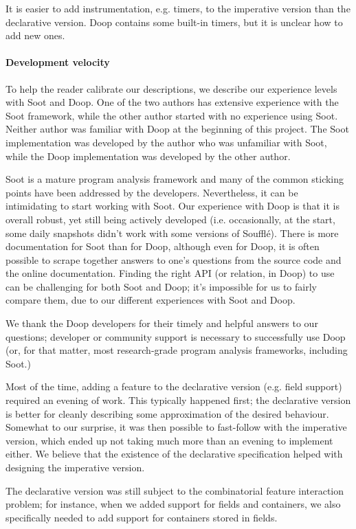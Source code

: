 It is easier to add instrumentation, e.g. timers, to the imperative version than the declarative version. Doop contains some built-in timers, but it is unclear how to add new ones.

\paragraph{Development velocity}
To help the reader calibrate our descriptions, we describe our experience levels with Soot and Doop. One of the two authors has extensive experience with the Soot framework, while the other author started with no experience using Soot. Neither author was familiar with Doop at the beginning of this project. The Soot implementation was developed by the author who was unfamiliar with Soot, while the Doop implementation was developed by the other author. 

Soot is a mature program analysis framework and many of the common sticking points have been addressed by the developers. Nevertheless, it can be intimidating to start working with Soot. Our experience with Doop is that it is overall robust, yet still being actively developed (i.e. occasionally, at the start, some daily snapshots didn't work with some versions of Soufflé). There is more documentation for Soot than for Doop, although even for Doop, it is often possible to scrape together answers to one's questions from the source code and the online documentation. Finding the right API (or relation, in Doop) to use can be challenging for both Soot and Doop; it's impossible for us to fairly compare them, due to our different experiences with Soot and Doop.

We thank the Doop developers for their timely and helpful answers to our questions; developer or community support is necessary to successfully use Doop (or, for that matter, most research-grade program analysis frameworks, including Soot.)

Most of the time, adding a feature to the declarative version (e.g. field support) required an evening of work. This typically happened first; the declarative version is better for cleanly describing some approximation of the desired behaviour. Somewhat to our surprise, it was then possible to fast-follow with the imperative version, which ended up not taking much more than an evening to implement either. We believe that the existence of the declarative specification helped with designing the imperative version.

The declarative version was still subject to the combinatorial feature interaction problem; for instance, when we added support for fields and containers, we also specifically needed to add support for containers stored in fields.

